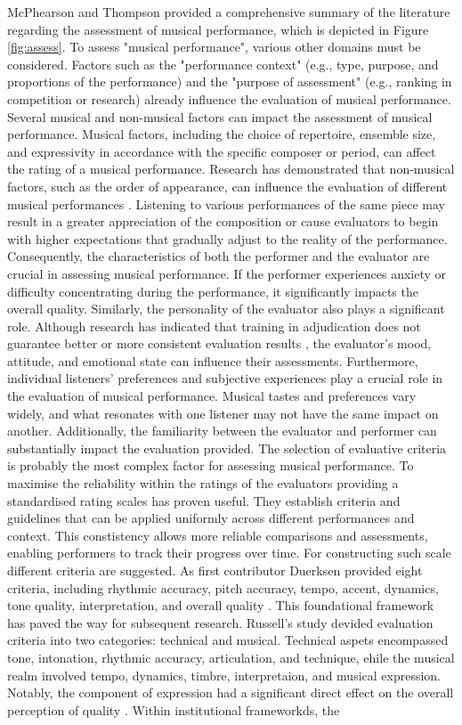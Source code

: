 McPhearson and Thompson \cite{McPhearson1998} provided a comprehensive summary of the literature regarding the assessment of musical performance, which is depicted in Figure \ref{fig:assess}. To assess "musical performance", various other domains must be considered. Factors such as the "performance context" (e.g., type, purpose, and proportions of the performance) and the "purpose of assessment" (e.g., ranking in competition or research) already influence the evaluation of musical performance. Several musical and non-musical factors can impact the assessment of musical performance. Musical factors, including the choice of repertoire, ensemble size, and expressivity in accordance with the specific composer or period, can affect the rating of a musical performance. Research has demonstrated that non-musical factors, such as the order of appearance, can influence the evaluation of different musical performances \cite{Flores1996}. Listening to various performances of the same piece may result in a greater appreciation of the composition or cause evaluators to begin with higher expectations that gradually adjust to the reality of the performance. Consequently, the characteristics of both the performer and the evaluator are crucial in assessing musical performance. If the performer experiences anxiety or difficulty concentrating during the performance, it significantly impacts the overall quality. Similarly, the personality of the evaluator also plays a significant role. Although research has indicated that training in adjudication does not guarantee better or more consistent evaluation results \cite{Fiske1977}, the evaluator's mood, attitude, and emotional state can influence their assessments. Furthermore, individual listeners' preferences and subjective experiences play a crucial role in the evaluation of musical performance. Musical tastes and preferences vary widely, and what resonates with one listener may not have the same impact on another.  Additionally, the familiarity between the evaluator and performer can substantially impact the evaluation provided. The selection of evaluative criteria is probably the most complex factor for assessing musical performance. To maximise the reliability within the ratings of the evaluators providing a standardised rating scales has proven useful. They establish criteria and guidelines that can be applied uniformly across different performances and context. This constistency allows more reliable comparisons and assessments, enabling performers to track their progress over time. For constructing such scale different criteria are suggested. As first contributor Duerksen provided eight criteria, including rhythmic accuracy, pitch accuracy, tempo, accent, dynamics, tone quality, interpretation, and overall quality \cite{Duerksen1972}. This foundational framework has paved the way for subsequent research. Russell's study devided evaluation criteria into two categories: technical and musical. Technical aspets encompassed tone, intonation, rhythmic accuracy, articulation, and technique, ehile the musical realm involved tempo, dynamics, timbre, interpretaion, and musical expression. Notably, the component of expression had a significant direct effect on the overall perception of quality \cite{Russell2010}. Within institutional frameworkds, the 